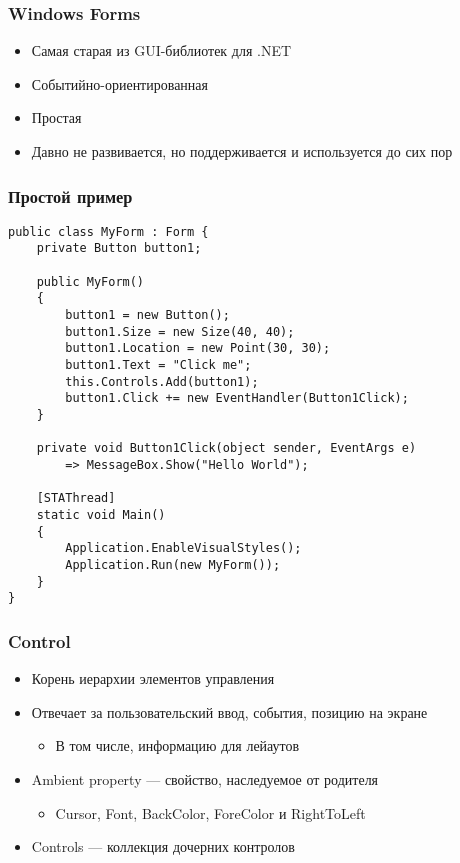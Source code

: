 \documentclass{../../slides-style}
\begin{document}
    \begin{frame}[plain]
        \titlepage
    \end{frame}

    \begin{frame}
        \frametitle{Windows Forms}
        \begin{itemize}
            \item Самая старая из GUI-библиотек для .NET
            \item Событийно-ориентированная
            \item Простая
            \item Давно не развивается, но поддерживается и используется до сих пор
        \end{itemize}
    \end{frame}

    \begin{frame}[fragile]
        \frametitle{Простой пример}
        \begin{scriptsize}
            \begin{verbatim}
public class MyForm : Form {
    private Button button1;

    public MyForm()
    {
        button1 = new Button();
        button1.Size = new Size(40, 40);
        button1.Location = new Point(30, 30);
        button1.Text = "Click me";
        this.Controls.Add(button1);
        button1.Click += new EventHandler(Button1Click);
    }

    private void Button1Click(object sender, EventArgs e)
        => MessageBox.Show("Hello World");

    [STAThread]
    static void Main()
    {
        Application.EnableVisualStyles();
        Application.Run(new MyForm());
    }
}
            \end{verbatim}
        \end{scriptsize}
    \end{frame}

    \begin{frame}
        \frametitle{Control}
        \begin{itemize}
            \item Корень иерархии элементов управления
            \item Отвечает за пользовательский ввод, события, позицию на экране
            \begin{itemize}
                \item В том числе, информацию для лейаутов
            \end{itemize}
            \item Ambient property --- свойство, наследуемое от родителя
            \begin{itemize}
                \item Cursor, Font, BackColor, ForeColor и RightToLeft
            \end{itemize}
            \item Controls --- коллекция дочерних контролов
        \end{itemize}
    \end{frame}
\end{document}
